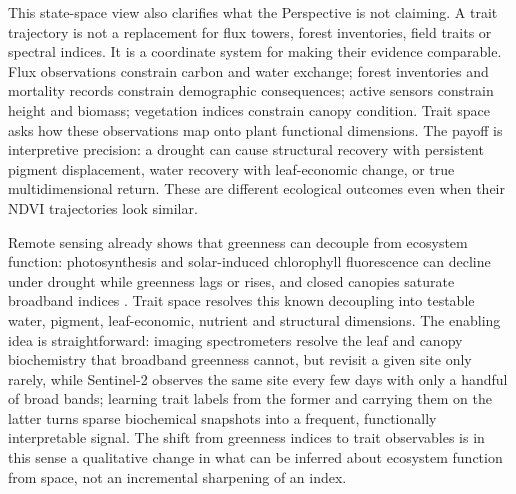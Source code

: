 \documentclass[pdflatex,sn-mathphys-num]{sn-jnl}
\begin{document}
This state-space view also clarifies what the Perspective is not claiming. A trait trajectory is not a replacement for flux towers, forest inventories, field traits or spectral indices. It is a coordinate system for making their evidence comparable. Flux observations constrain carbon and water exchange; forest inventories and mortality records constrain demographic consequences; active sensors constrain height and biomass; vegetation indices constrain canopy condition. Trait space asks how these observations map onto plant functional dimensions. The payoff is interpretive precision: a drought can cause structural recovery with persistent pigment displacement, water recovery with leaf-economic change, or true multidimensional return. These are different ecological outcomes even when their NDVI trajectories look similar.

Remote sensing already shows that greenness can decouple from ecosystem function: photosynthesis and solar-induced chlorophyll fluorescence can decline under drought while greenness lags or rises, and closed canopies saturate broadband indices \cite{yang2018amazon,koren2018amazon,li2023droughtphysiology,behera2025sifyield,gitelson1997chlorophyll,gitelson2004wdrvi,gitelson2005canopychlorophyll,gao2023visaturation,tian2025ndvisaturation}. Trait space resolves this known decoupling into testable water, pigment, leaf-economic, nutrient and structural dimensions. The enabling idea is straightforward: imaging spectrometers resolve the leaf and canopy biochemistry that broadband greenness cannot, but revisit a given site only rarely, while Sentinel-2 observes the same site every few days with only a handful of broad bands; learning trait labels from the former and carrying them on the latter turns sparse biochemical snapshots into a frequent, functionally interpretable signal. The shift from greenness indices to trait observables is in this sense a qualitative change in what can be inferred about ecosystem function from space, not an incremental sharpening of an index.
\end{document}
